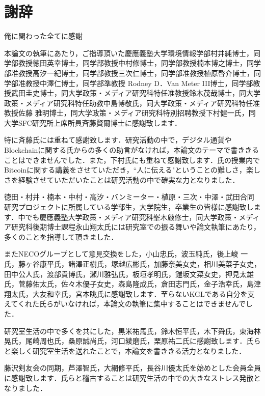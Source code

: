 \chapter*{謝辞}
\label{thanks}


俺に関わった全てに感謝

\fi
本論文の執筆にあたり，ご指導頂いた慶應義塾大学環境情報学部村井純博士，同学部教授徳田英幸博士，同学部教授中村修博士，同学部教授楠本博之博士，同学部准教授高汐一紀博士，同学部教授三次仁博士，同学部准教授植原啓介博士，同学部准教授中澤仁博士，同学部準教授 Rodney D．Van Meter III博士，同学部教授武田圭史博士，同大学政策・メディア研究科特任准教授鈴木茂哉博士，同大学政策・メディア研究科特任助教中島博敬氏，同大学政策・メディア研究科特任准教授佐藤 雅明博士，同大学政策・メディア研究科特別招聘教授下村健一氏，同大学SFC研究所上席所員斉藤賢爾博士に感謝致します．


特に斉藤氏には重ねて感謝致します．研究活動の中で，デジタル通貨やBlockchainに関する氏からの多くの助言がなければ，本論文のテーマで書ききることはできませんでした．また，下村氏にも重ねて感謝致します．氏の授業内でBitcoinに関する講義をさせていただき，``人に伝える"ということの難しさ，楽しさを経験させていただいたことは研究活動の中で確実な力となりました．


徳田・村井・楠本・中村・高汐・バンミーター・植原・三次・中澤・武田合同研究プロジェクトに所属している学部生，大学院生，卒業生の皆様に感謝致します．中でも慶應義塾大学政策・メディア研究科峯木厳修士，同大学政策・メディア研究科後期博士課程永山翔太氏には研究室での振る舞いや論文執筆にあたり，多くのことを指導して頂きました．


またNECOグループとして意見交換をした，小山忠氏，波玉純氏，後上峻
一氏，藤ヶ谷康平氏，諸澤正樹氏，塚越広彬氏，加藤奈美女史，相川美菜子女史，田中公人氏，渡部貴博氏，瀬川雅弘氏，板垣孝明氏，鎧坂文菜女史，押見太雄氏，菅藤佑太氏，佐々木優子女史，森島隆成氏，倉田志門氏，金子浩幸氏，島津翔太氏，大友和幸氏，宮本眺氏に感謝致します．至らないKGLである自分を支えてくれた氏らがいなければ，本論文の執筆に集中することはできませんでした．


研究室生活の中で多くを共にした，黒米祐馬氏，鈴木恒平氏，木下舜氏，東海林晃氏，尾崎周也氏，桑原誠尚氏，河口綾磨氏，栗原祐二氏に感謝致します．氏らと楽しく研究室生活を送れたことで，本論文を書ききる活力となりました．


藤沢剣友会の同期，芦澤智氏，大網修平氏，長谷川優太氏を始めとした会員全員に感謝致します．氏らと稽古することは研究生活の中での大きなストレス発散となりました．


